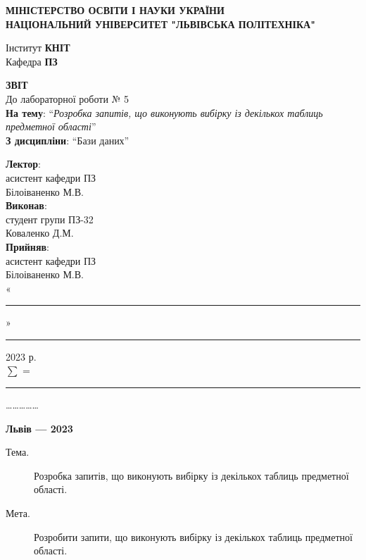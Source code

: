 \documentclass[14pt]{extreport}
\newcommand\subject{Бази даних}
\newcommand\lecturer{асистент кафедри ПЗ\\Білоіваненко М.В.}
\newcommand\teacher{асистент кафедри ПЗ\\Білоіваненко М.В.}
\newcommand\mygroup{ПЗ-32}
\newcommand\lab{5}
\newcommand\theme{Розробка запитів, що виконують вибірку із декількох таблиць предметної області}
\newcommand\purpose{Розробити запити, що виконують вибірку із декількох таблиць предметної області}
\begin{document}
\begin{normalsize}
	\begin{titlepage}
		\thispagestyle{empty}
		\begin{center}
			\textbf{МІНІСТЕРСТВО ОСВІТИ І НАУКИ УКРАЇНИ\\
				НАЦІОНАЛЬНИЙ УНІВЕРСИТЕТ "ЛЬВІВСЬКА ПОЛІТЕХНІКА"}
		\end{center}
		\begin{flushright}
			Інститут \textbf{КНІТ}\\
			Кафедра \textbf{ПЗ}
		\end{flushright}
		\vspace{200pt}
		\begin{center}
			\textbf{ЗВІТ}\\
			\vspace{10pt}
			До лабораторної роботи № \lab\\
			\textbf{На тему}: “\textit{\theme}”\\
			\textbf{З дисципліни}: “\subject”
		\end{center}
		\vspace{40pt}
		\begin{flushright}
			
			\textbf{Лектор}:\\
			\lecturer\\
			\vspace{10pt}
			\textbf{Виконав}:\\
			
			студент групи \mygroup\\
			Коваленко Д.М.\\
			\vspace{10pt}
			\textbf{Прийняв}:\\
			
			\teacher\\
			
			\vspace{28pt}
			«\rule{1cm}{0.15mm}» \rule{1.5cm}{0.15mm} 2023 р.\\
			$\sum$ = \rule{1cm}{0.15mm}……………\\
			
		\end{flushright}
		\vspace{\fill}
		\begin{center}
			\textbf{Львів — 2023}
		\end{center}
	\end{titlepage}
		
	\begin{description}
		\item[Тема.] \theme.
		\item[Мета.] \purpose.
	\end{description}


\end{normalsize}
\end{document}
